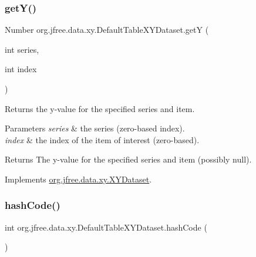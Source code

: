 \mbox{\label{classorg_1_1jfree_1_1data_1_1xy_1_1_default_table_x_y_dataset_a14d79167e9baad0df8490dc6e357e791}} 
\subsubsection{\texorpdfstring{get\+Y()}{getY()}}
{\footnotesize\ttfamily Number org.\+jfree.\+data.\+xy.\+Default\+Table\+X\+Y\+Dataset.\+getY (\begin{DoxyParamCaption}\item[{int}]{series,  }\item[{int}]{index }\end{DoxyParamCaption})}

Returns the y-\/value for the specified series and item.


\begin{DoxyParams}{Parameters}
{\em series} & the series (zero-\/based index). \\
\hline
{\em index} & the index of the item of interest (zero-\/based).\\
\hline
\end{DoxyParams}
\begin{DoxyReturn}{Returns}
The y-\/value for the specified series and item (possibly {\ttfamily null}). 
\end{DoxyReturn}


Implements \mbox{\hyperlink{interfaceorg_1_1jfree_1_1data_1_1xy_1_1_x_y_dataset_aa915867221e0f94021bad3140db5254e}{org.\+jfree.\+data.\+xy.\+X\+Y\+Dataset}}.

\mbox{\label{classorg_1_1jfree_1_1data_1_1xy_1_1_default_table_x_y_dataset_ab97163d6044f6ec8708f91a16d0191ff}} 
\subsubsection{\texorpdfstring{hash\+Code()}{hashCode()}}
{\footnotesize\ttfamily int org.\+jfree.\+data.\+xy.\+Default\+Table\+X\+Y\+Dataset.\+hash\+Code (\begin{DoxyParamCaption}{ }\end{DoxyParamCaption})}

